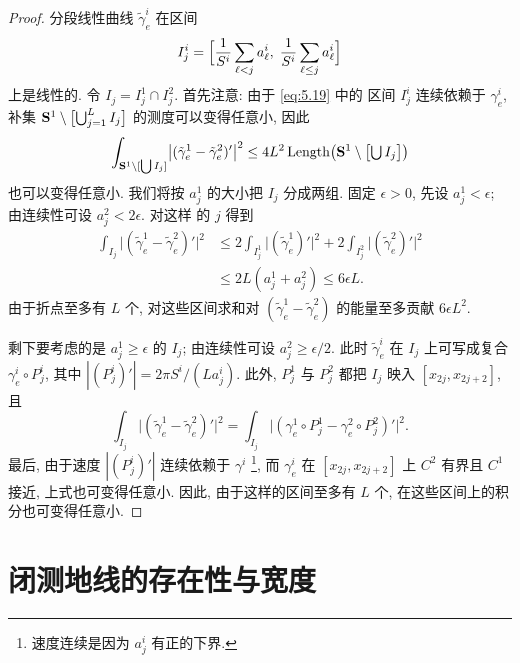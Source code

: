 \begin{proof}
分段线性曲线 $\tilde{\gamma}_e^i$ 在区间
\begin{equation}
I_j^i=\Bigl[\frac1{S^i}\sum_{\ell<j}a_\ell^i,\;
\frac1{S^i}\sum_{\ell\leq j}a_\ell^i\Bigr]
\label{eq:5.19}
\end{equation}
上是线性的. 令 $I_j=I_j^1\cap I_j^2$. 首先注意: 由于 \eqref{eq:5.19} 中的
区间 $I_j^i$ 连续依赖于 $\gamma_e^i$, 补集
$\mathbf{S}^1\setminus\bigl[\bigcup_{j=1}^LI_j\bigr]$ 的测度可以变得任意小, 因此
\begin{equation}
\int_{\mathbf{S}^1\setminus[\bigcup I_j]}
\bigl|(\tilde{\gamma}_e^1-\tilde{\gamma}_e^2)'\bigr|^2
\leq 4L^2\operatorname{Length}\bigl(\mathbf{S}^1\setminus\bigl[\textstyle\bigcup I_j\bigr]\bigr)
\label{eq:5.20}
\end{equation}
也可以变得任意小. 我们将按 $a_j^1$ 的大小把 $I_j$ 分成两组. 固定
$\epsilon>0$, 先设 $a_j^1<\epsilon$; 由连续性可设 $a_j^2<2\epsilon$. 对这样
的 $j$ 得到
\begin{equation}
\begin{aligned}
\int_{I_j}\bigl|(\tilde{\gamma}_e^1-\tilde{\gamma}_e^2)'\bigr|^2
&\leq 2\int_{I_j^1}\bigl|(\tilde{\gamma}_e^1)'\bigr|^2
+2\int_{I_j^2}\bigl|(\tilde{\gamma}_e^2)'\bigr|^2\\
&\leq 2L(a_j^1+a_j^2)\leq 6\epsilon L.
\end{aligned}
\label{eq:5.21}
\end{equation}
由于折点至多有 $L$ 个, 对这些区间求和对
$(\tilde{\gamma}_e^1-\tilde{\gamma}_e^2)$ 的能量至多贡献 $6\epsilon L^2$.

剩下要考虑的是 $a_j^1\geq\epsilon$ 的 $I_j$; 由连续性可设
$a_j^2\geq\epsilon/2$. 此时 $\tilde{\gamma}_e^i$ 在 $I_j$ 上可写成复合
$\gamma_e^i\circ P_j^i$, 其中 $|(P_j^i)'|=2\pi S^i/(La_j^i)$. 此外,
$P_j^1$ 与 $P_j^2$ 都把 $I_j$ 映入 $[x_{2j},x_{2j+2}]$, 且
\begin{equation}
\int_{I_j}\bigl|(\tilde{\gamma}_e^1-\tilde{\gamma}_e^2)'\bigr|^2
=\int_{I_j}\bigl|(\gamma_e^1\circ P_j^1-\gamma_e^2\circ P_j^2)'\bigr|^2.
\label{eq:5.22}
\end{equation}
最后, 由于速度 $|(P_j^i)'|$ 连续依赖于 $\gamma^i$%
\footnote{速度连续是因为 $a_j^i$ 有正的下界.}, 而 $\gamma_e^i$ 在
$[x_{2j},x_{2j+2}]$ 上 $C^2$ 有界且 $C^1$ 接近, 上式也可变得任意小.
因此, 由于这样的区间至多有 $L$ 个, 在这些区间上的积分也可变得任意小.
\end{proof}

\section{闭测地线的存在性与宽度}
\label{sec:5.3}


